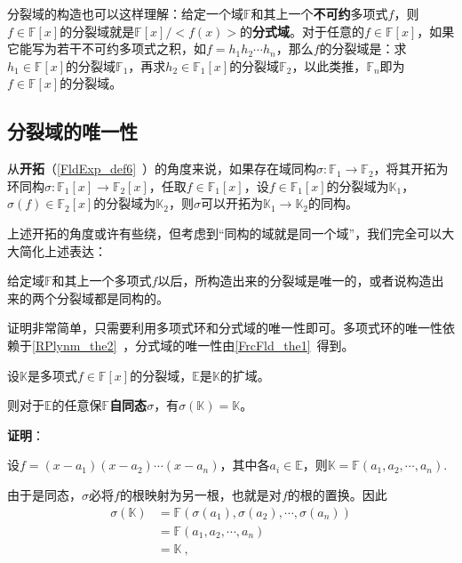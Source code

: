 分裂域的构造也可以这样理解：给定一个域$\mathbb{F}$和其上一个\textbf{不可约}多项式$f$，则$f\in\mathbb{F}[x]$的分裂域就是$\mathbb{F}[x]/<f(x)>$的\textbf{分式域}。对于任意的$f\in\mathbb{F}[x]$，如果它能写为若干不可约多项式之积，如$f=h_1h_2\cdots h_n$，那么$f$的分裂域是：求$h_1\in\mathbb{F}[x]$的分裂域$\mathbb{F}_1$，再求$h_2\in\mathbb{F}_1[x]$的分裂域$\mathbb{F}_2$，以此类推，$\mathbb{F}_n$即为$f\in\mathbb{F}[x]$的分裂域。










\subsection{分裂域的唯一性}

从\textbf{开拓}（\autoref{FldExp_def6}~）的角度来说，如果存在域同构$\sigma:\mathbb{F}_1\to\mathbb{F}_2$，将其开拓为环同构$\sigma:\mathbb{F}_1[x]\to\mathbb{F}_2[x]$，任取$f\in\mathbb{F}_1[x]$，设$f\in\mathbb{F}_1[x]$的分裂域为$\mathbb{K}_1$，$\sigma(f)\in\mathbb{F}_2[x]$的分裂域为$\mathbb{K}_2$，则$\sigma$可以开拓为$\mathbb{K}_1\to\mathbb{K}_2$的同构。

上述开拓的角度或许有些绕，但考虑到“同构的域就是同一个域”，我们完全可以大大简化上述表达：

\begin{theorem}{}
给定域$\mathbb{F}$和其上一个多项式$f$以后，所构造出来的分裂域是唯一的，或者说构造出来的两个分裂域都是同构的。
\end{theorem}

证明非常简单，只需要利用多项式环和分式域的唯一性即可。多项式环的唯一性依赖于\autoref{RPlynm_the2}~，分式域的唯一性由\autoref{FrcFld_the1}~得到。





\begin{theorem}{}\label{SpltFd_the3}
设$\mathbb{K}$是多项式$f\in\mathbb{F}[x]$的分裂域，$\mathbb{E}$是$\mathbb{K}$的扩域。

则对于$\mathbb{E}$的任意保$\mathbb{F}$\textbf{自同态}$\sigma$，有$\sigma(\mathbb{K})=\mathbb{K}$。
\end{theorem}

\textbf{证明}：

设$f=(x-a_1)(x-a_2)\cdots(x-a_n)$，其中各$a_i\in\mathbb{E}$，则$\mathbb{K}=\mathbb{F}(a_1, a_2, \cdots, a_n)$.

由于是同态，$\sigma$必将$f$的根映射为另一根，也就是对$f$的根的置换。因此
\begin{equation}
\begin{aligned}
\sigma(\mathbb{K})&=\mathbb{F}(\sigma(a_1), \sigma(a_2), \cdots, \sigma(a_n))\\
&=\mathbb{F}(a_1, a_2, \cdots, a_n)\\
&=\mathbb{K}~,
\end{aligned}
\end{equation}


